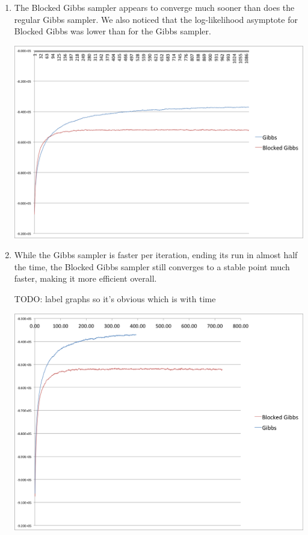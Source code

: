 \documentclass[12pt, letterpaper]{article}
\begin{document}
\begin{enumerate}[1.]
    \item 
        The Blocked Gibbs sampler appears to converge much sooner than does the regular Gibbs sampler. We also noticed that the log-likelihood asymptote for Blocked Gibbs was lower than for the Gibbs sampler.

        \includegraphics[scale=0.5]{ml_graph_2}\\

   \item
       While the Gibbs sampler is faster per iteration, ending its run in almost half the time, the Blocked Gibbs sampler still converges to a stable point much faster, making it more efficient overall.

       TODO: label graphs so it's obvious which is with time

        \includegraphics[scale=0.5]{ml_graph_3}\\


\end{enumerate}
\end{document}
